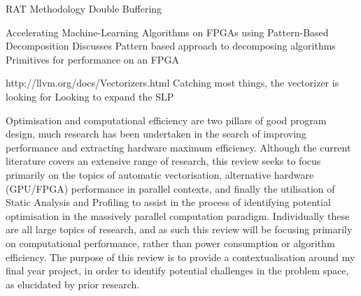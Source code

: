 RAT Methodology
	Double Buffering

Accelerating Machine-Learning Algorithms on FPGAs using Pattern-Based Decomposition
	Discusses Pattern based approach to decomposing algorithms
	Primitives for performance on an FPGA

http://llvm.org/docs/Vectorizers.html
	Catching most things, the vectorizer is looking for
	Looking to expand the SLP

Optimisation and computational efficiency are two pillars of good program design, much research has been undertaken in the search of improving performance and extracting hardware maximum efficiency. Although the current literature covers an extensive range of research, this review seeks to focus primarily on the topics of automatic vectorisation, alternative hardware (GPU/FPGA) performance in parallel contexts, and finally the utilisation of Static Analysis and Profiling to assist in the process of identifying potential optimisation in the massively parallel computation paradigm. Individually these are all large topics of research, and as such this review will be focusing primarily on computational performance, rather than power consumption or algorithm efficiency. The purpose of this review is to provide a contextualisation around my final year project, in order to identify potential challenges in the problem space, as elucidated by prior research. 
